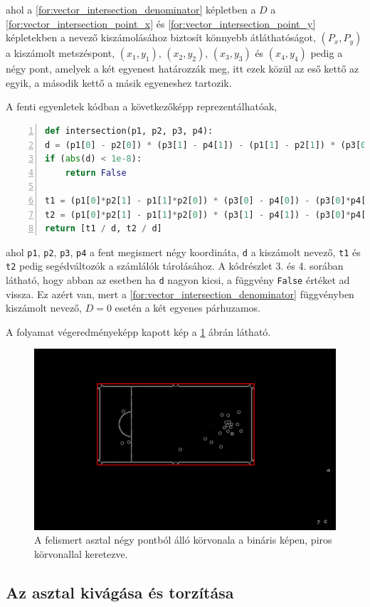 \par ahol a \ref{for:vector_intersection_denominator} képletben a $D$ a \ref{for:vector_intersection_point_x} és \ref{for:vector_intersection_point_y} képletekben a nevező kiszámolásához biztosít könnyebb átláthatóságot, $(P_x, P_y)$ a kiszámolt metszéspont, $(x_1, y_1)$, $(x_2, y_2)$, $(x_3, y_3)$ és $(x_4, y_4)$ pedig a négy pont, amelyek a két egyenest határozzák meg, itt ezek közül az eső kettő az egyik, a második kettő a másik egyeneshez tartozik.
\par A fenti egyenletek kódban a következőképp reprezentálhatóak,

\vspace{2mm}\begin{lstlisting}[language=Python, numbers=left]
def intersection(p1, p2, p3, p4):
d = (p1[0] - p2[0]) * (p3[1] - p4[1]) - (p1[1] - p2[1]) * (p3[0] - p4[0])
if (abs(d) < 1e-8):
    return False

t1 = (p1[0]*p2[1] - p1[1]*p2[0]) * (p3[0] - p4[0]) - (p3[0]*p4[1] - p3[1]*p4[0]) * (p1[0] - p2[0])
t2 = (p1[0]*p2[1] - p1[1]*p2[0]) * (p3[1] - p4[1]) - (p3[0]*p4[1] - p3[1]*p4[0]) * (p1[1] - p2[1])
return [t1 / d, t2 / d]
\end{lstlisting}

\par ahol \lstinline{p1}, \lstinline{p2}, \lstinline{p3}, \lstinline{p4} a fent megismert négy koordináta, \lstinline{d} a kiszámolt nevező, \lstinline{t1} és \lstinline{t2} pedig segédváltozók a számlálók tárolásához. A kódrészlet 3. és 4. sorában látható, hogy abban az esetben ha \lstinline{d} nagyon kicsi, a függvény \lstinline{False} értéket ad vissza. Ez azért van, mert a \ref{for:vector_intersection_denominator} függvényben kiszámolt nevező, $D = 0$ esetén a két egyenes párhuzamos.
\par A folyamat végeredményeképp kapott kép a \ref{fig:bemeneti_kep_quad} ábrán látható.

\begin{figure}[!ht]
    \centering
    \includegraphics[width=150mm, keepaspectratio]{figures/input_screen_quad.png}
    \caption{A felismert asztal négy pontból álló körvonala a bináris képen, piros körvonallal keretezve.}
    \label{fig:bemeneti_kep_quad}
\end{figure}

\subsection{Az asztal kivágása és torzítása}
